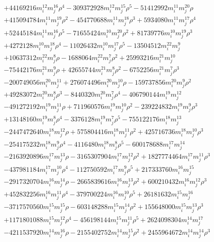 {\begin{align*}
&+44169216m_i^{12}m_j^{16}\rho^{4}-309372928m_i^{12}m_j^{15}\rho^{5}-51412992m_i^{11}m_j^{20}\rho\\
&+415094784m_i^{11}m_j^{19}\rho^{2}-454770688m_i^{11}m_j^{18}\rho^{3}+5934080m_i^{11}m_j^{17}\rho^{4}\\
&+52445184m_i^{11}m_j^{16}\rho^{5}-71655424m_i^{10}m_j^{20}\rho^{2}+81739776m_i^{10}m_j^{19}\rho^{3}\\
&+4272128m_i^{10}m_j^{18}\rho^{4}-11026432m_i^{10}m_j^{17}\rho^{5}-13504512m_i^{22}m_j^{9}\\
&+10637312m_i^{22}m_j^{8}\rho-1688064m_i^{22}m_j^{7}\rho^{2}+25993216m_i^{21}m_j^{10}\\
&-75442176m_i^{21}m_j^{9}\rho+42655744m_i^{21}m_j^{8}\rho^{2}-6752256m_i^{21}m_j^{7}\rho^{3}\\
&-200749056m_i^{20}m_j^{11}+276074496m_i^{20}m_j^{10}\rho-159737856m_i^{20}m_j^{9}\rho^{2}\\
&+49283072m_i^{20}m_j^{8}\rho^{3}-8440320m_i^{20}m_j^{7}\rho^{4}-406790144m_i^{19}m_j^{12}\\
&-491272192m_i^{19}m_j^{11}\rho+711960576m_i^{19}m_j^{10}\rho^{2}-239224832m_i^{19}m_j^{9}\rho^{3}\\
&+13148160m_i^{19}m_j^{8}\rho^{4}-3376128m_i^{19}m_j^{7}\rho^{5}-755122176m_i^{18}m_j^{13}\\
&-2447472640m_i^{18}m_j^{12}\rho+575804416m_i^{18}m_j^{11}\rho^{2}+425716736m_i^{18}m_j^{10}\rho^{3}\\
&-254175232m_i^{18}m_j^{9}\rho^{4}-4116480m_i^{18}m_j^{8}\rho^{5}-600178688m_i^{17}m_j^{14}\\
&-2163920896m_i^{17}m_j^{13}\rho-3165307904m_i^{17}m_j^{12}\rho^{2}+1827774464m_i^{17}m_j^{11}\rho^{3}\\
&-437981184m_i^{17}m_j^{10}\rho^{4}-112750592m_i^{17}m_j^{9}\rho^{5}+217333760m_i^{16}m_j^{15}\\
&-2917320704m_i^{16}m_j^{14}\rho-2665839616m_i^{16}m_j^{13}\rho^{2}+600210432m_i^{16}m_j^{12}\rho^{3}\\
&+452832256m_i^{16}m_j^{11}\rho^{4}-379700224m_i^{16}m_j^{10}\rho^{5}+26181632m_i^{15}m_j^{16}\\
&-3717570560m_i^{15}m_j^{15}\rho-603148288m_i^{15}m_j^{14}\rho^{2}+155648000m_i^{15}m_j^{13}\rho^{3}\\
&+1171801088m_i^{15}m_j^{12}\rho^{4}-456198144m_i^{15}m_j^{11}\rho^{5}+2624098304m_i^{14}m_j^{17}\\
&-4211537920m_i^{14}m_j^{16}\rho-2155402752m_i^{14}m_j^{15}\rho^{2}+2455964672m_i^{14}m_j^{14}\rho^{3}\\

\end{align*}}
